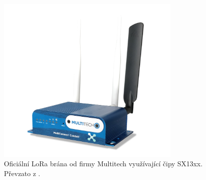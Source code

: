       \begin{figure} [!ht]
        \centering
        \caption{Oficiální LoRa brána od firmy Multitech využívající čipy SX13xx. Převzato z \cite{website:10}.}
        \includegraphics[width=0.8\textwidth]{LPWAN/Figs/lorawan_gw.png}
    \end{figure} 
    













